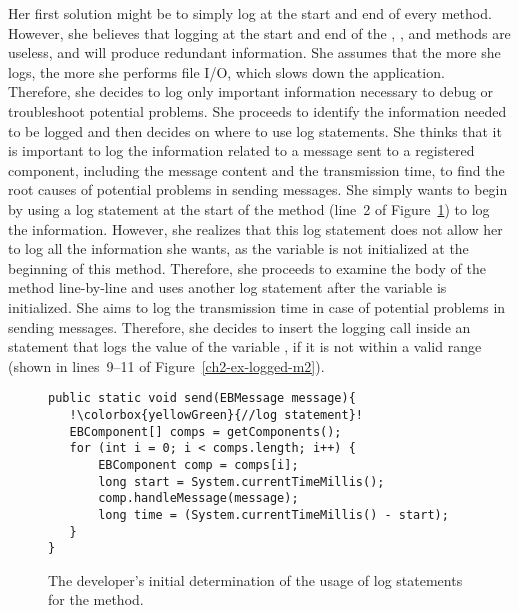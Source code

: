 Her first solution might be to simply log at the start and end of every method. However, she believes that logging at the start and end of the , \-\-, and  methods are useless, and will produce redundant information. She assumes that the more she logs, the more she performs file I/O, which slows down the application. Therefore, she decides to log only important information necessary to debug or troubleshoot potential problems. She proceeds to identify the information needed to be logged and then decides on where to use log statements. She thinks that it is important to log the information related to a message sent to a registered component, including the message content and the transmission time, to find the root causes of potential problems in sending messages. She simply wants to begin by using a log statement at the start of the  method (line~2 of Figure~\ref{ch2-ex-logged-m1}) to log the information. However, she realizes that this log statement does not allow her to log all the information she wants, as the  variable is not initialized at the beginning of this method. Therefore, she proceeds to examine the body of the  method line-by-line and uses another log statement after the  variable is initialized. She aims to log the transmission time in case of potential problems in sending messages. Therefore, she decides to insert the logging call inside an  statement that logs the value of the variable , if it is not within a valid range (shown in lines~9--11 of Figure~\ref{ch2-ex-logged-m2}).

\begin{figure}[p]
\def\baselinestretch{1}
\begin{lstlisting}[escapechar=!]
public static void send(EBMessage message){
   !\colorbox{yellowGreen}{//log statement}!
   EBComponent[] comps = getComponents();
   for (int i = 0; i < comps.length; i++) {
       EBComponent comp = comps[i];
       long start = System.currentTimeMillis();
       comp.handleMessage(message);
       long time = (System.currentTimeMillis() - start);
   }
}
\end{lstlisting}
\caption[The developer's initial determination of the usage of logging calls.]{The developer's initial determination of the usage of log statements for the  method.\label{ch2-ex-logged-m1}}
\end{figure}

